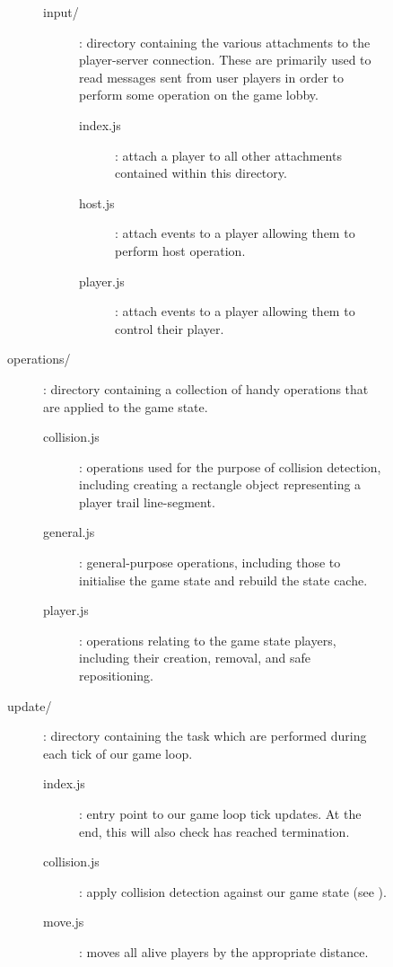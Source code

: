 \documentclass{standalone}
\begin{document}
\begin{formal}
\begin{description}
\begin{description}
\begin{description}
\begin{description}
			      			\item[input/]: directory containing the various attachments to the player-server connection. These are primarily used to read messages sent from user players in order to perform some operation on the game lobby.
					      	\begin{description}
				      			\item[index.js]: attach a player to all other attachments contained within this directory.
				      			\item[host.js]: attach events to a player allowing them to perform host operation.
				      			\item[player.js]: attach events to a player allowing them to control their player.
				      		\end{description}
			      		\end{description}

			      		\item[operations/]: directory containing a collection of handy operations that are applied to the game state.
				      	\begin{description}
			      			\item[collision.js]: operations used for the purpose of collision detection, including creating a rectangle object representing a player trail line-segment.
			      			\item[general.js]: general-purpose operations, including those to initialise the game state and rebuild the state cache.
			      			\item[player.js]: operations relating to the game state players, including their creation, removal, and safe repositioning.
			      		\end{description}

			      		\item[update/]: directory containing the task which are performed during each tick of our game loop.
				      	\begin{description}
			      			\item[index.js]: entry point to our game loop tick updates. At the end, this will also check has reached termination.
			      			\item[collision.js]: apply collision detection against our game state (see ). 
			      			\item[move.js]: moves all alive players by the appropriate distance.
			      		\end{description}


\end{description}
\end{description}
\end{description}
\end{formal}
\end{document}
